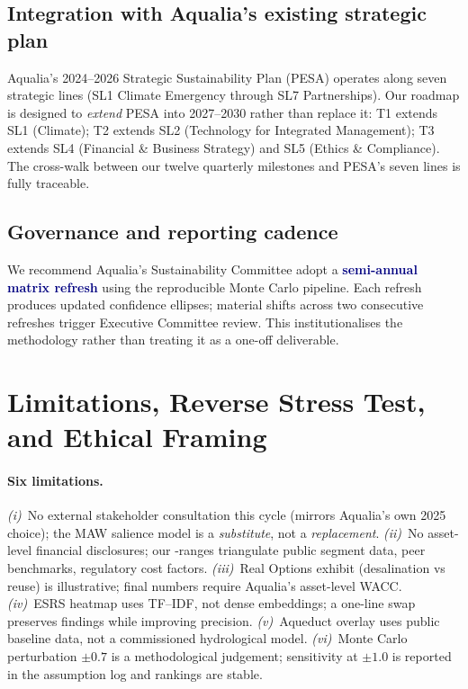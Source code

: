 \documentclass[11pt, a4paper]{article}
\newcommand{\euro}{\texteuro}
\newcommand{\nav}[1]{\textcolor{navy}{\textbf{#1}}}
\begin{document}
\subsection{Integration with Aqualia's existing strategic plan}

Aqualia's 2024--2026 Strategic Sustainability Plan (PESA) operates along seven strategic lines (SL1 Climate Emergency through SL7 Partnerships). Our roadmap is designed to \emph{extend} PESA into 2027--2030 rather than replace it: T1 extends SL1 (Climate); T2 extends SL2 (Technology for Integrated Management); T3 extends SL4 (Financial \& Business Strategy) and SL5 (Ethics \& Compliance). The cross-walk between our twelve quarterly milestones and PESA's seven lines is fully traceable.

\subsection{Governance and reporting cadence}

We recommend Aqualia's Sustainability Committee adopt a \nav{semi-annual matrix refresh} using the reproducible Monte Carlo pipeline. Each refresh produces updated confidence ellipses; material shifts across two consecutive refreshes trigger Executive Committee review. This institutionalises the methodology rather than treating it as a one-off deliverable.

\section{Limitations, Reverse Stress Test, and Ethical Framing}
\label{sec:limits}

\paragraph{Six limitations.}
\emph{(i)}~No external stakeholder consultation this cycle (mirrors Aqualia's own 2025 choice); the MAW salience model is a \emph{substitute}, not a \emph{replacement}. \emph{(ii)}~No asset-level financial disclosures; our \euro{}-ranges triangulate public segment data, peer benchmarks, regulatory cost factors. \emph{(iii)}~Real Options exhibit (desalination vs reuse) is illustrative; final numbers require Aqualia's asset-level WACC. \emph{(iv)}~ESRS heatmap uses TF--IDF, not dense embeddings; a one-line swap preserves findings while improving precision. \emph{(v)}~Aqueduct overlay uses public baseline data, not a commissioned hydrological model. \emph{(vi)}~Monte Carlo perturbation $\pm 0.7$ is a methodological judgement; sensitivity at $\pm 1.0$ is reported in the assumption log and rankings are stable.
\end{document}
